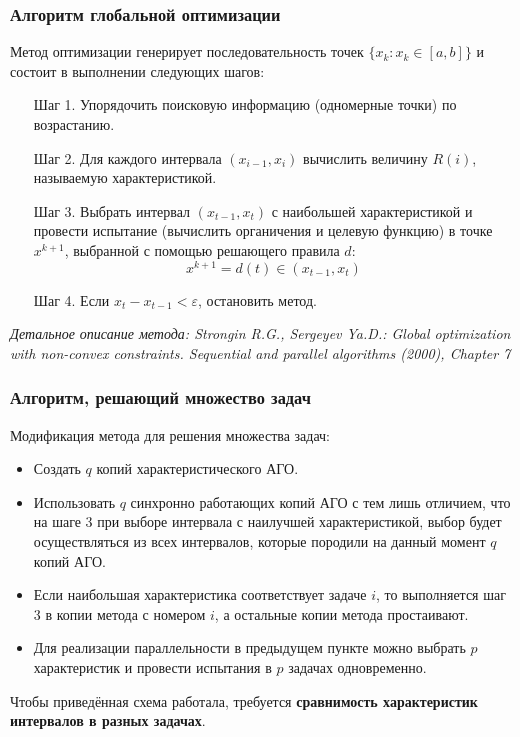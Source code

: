 \documentclass[aspectratio=1610]{beamer}
\begin{document}
\begin{frame}
  \frametitle{Алгоритм глобальной оптимизации}
  Метод оптимизации генерирует последовательность точек \(\{x_k:x_k\in[a,b]\}\) и состоит в выполнении следующих шагов:
  \begin{enumerate}
    \setlength{\itemindent}{.1in}
    \item[Шаг 1.] Упорядочить поисковую информацию (одномерные точки) по возрастанию.
    \item[Шаг 2.] Для каждого интервала \((x_{i-1}, x_i)\) вычислить величину \(R(i)\), называемую характеристикой.
    \item[Шаг 3.] Выбрать интервал \((x_{t-1}, x_{t})\) с наибольшей характеристикой и
    провести испытание (вычислить органичения и целевую функцию) в точке \(x^{k+1}\), выбранной с помощью решающего правила \(d\):
    \begin{displaymath}
      x^{k+1}=d(t)\in (x_{t-1}, x_{t})
    \end{displaymath}
    \item[Шаг 4.] Если \(x_{t}-x_{t-1}<\varepsilon\), остановить метод.
  \end{enumerate}
  \textit{\footnotesize	{Детальное описание метода: Strongin R.G., Sergeyev Ya.D.: Global optimization with non-convex constraints. Sequential and parallel algorithms (2000), Chapter 7}}
\end{frame}

\begin{frame}
  \frametitle{Алгоритм, решающий множество задач}
  Модификация метода для решения множества задач:
  \begin{itemize}
    \item Создать \(q\) копий характеристического АГО.
    \item Использовать \(q\) синхронно работающих копий АГО с тем лишь отличием, что на шаге 3 при выборе
    интервала с наилучшей характеристикой, выбор будет осуществляться из всех интервалов, которые
    породили на данный момент \(q\) копий АГО.\
    \item Если наибольшая характеристика соответствует
    задаче \(i\), то выполняется шаг 3 в копии метода с номером \(i\), а остальные копии метода простаивают.
    \item Для реализации параллельности в предыдущем пункте можно выбрать \(p\) характеристик и провести
    испытания в \(p\) задачах одновременно.
  \end{itemize}
  Чтобы приведённая схема работала, требуется \textbf{сравнимость характеристик интервалов в разных задачах}.
\end{frame}
\end{document}

